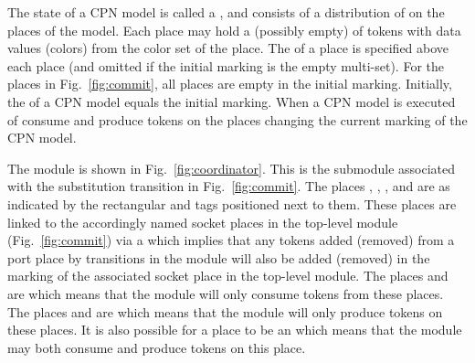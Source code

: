 
The state of a CPN model is called a , and consists
of a distribution of  on the places of the model. Each
place may hold a (possibly empty)  of tokens with
data values (colors) from the color set of the place. The
 of a place is specified above each place
(and omitted if the initial marking is the empty multi-set). For the
places in Fig.~\ref{fig:commit}, all places are empty in the initial
marking. Initially, the  of a CPN model
equals the initial marking. When a CPN model is executed
 of  consume and
produce tokens on the places changing the current marking of the CPN model.

 

The  module is shown in
Fig.~\ref{fig:coordinator}. This is the submodule associated with the
 substitution transition in
Fig.~\ref{fig:commit}. The places ,
, , and  are
 as indicated by the rectangular  and
 tags positioned next to them. These places are linked to
the accordingly named socket places in the top-level module
(Fig.~\ref{fig:commit}) via a  which
implies that any tokens added (removed) from a port place by
transitions in the  module will also be added
(removed) in the marking of the associated socket place in the
top-level module. The places  and 
are  which means that the
 module will only consume tokens from these
places.  The places  and  are
 which means that the
 module will only produce tokens on these
places. It is also possible for a place to be an  which means that the module may both consume and produce
tokens on this place.

